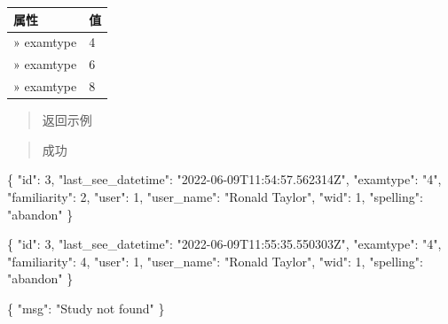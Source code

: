 \documentclass[
]{article}
\newenvironment{Shaded}{}{}
\newcommand{\DataTypeTok}[1]{\textcolor[rgb]{0.56,0.13,0.00}{#1}}
\newcommand{\DecValTok}[1]{\textcolor[rgb]{0.25,0.63,0.44}{#1}}
\newcommand{\FunctionTok}[1]{\textcolor[rgb]{0.02,0.16,0.49}{#1}}
\newcommand{\StringTok}[1]{\textcolor[rgb]{0.25,0.44,0.63}{#1}}
\begin{document}
\begin{longtable}[]{@{}ll@{}}
\toprule
属性 & 值 \\
\midrule
\endhead
» examtype & 4 \\
» examtype & 6 \\
» examtype & 8 \\
\bottomrule
\end{longtable}

\begin{quote}
返回示例
\end{quote}

\begin{quote}
成功
\end{quote}

\begin{Shaded}
\begin{Highlighting}[]
\FunctionTok{\{}
  \DataTypeTok{"id"}\FunctionTok{:} \DecValTok{3}\FunctionTok{,}
  \DataTypeTok{"last\_see\_datetime"}\FunctionTok{:} \StringTok{"2022{-}06{-}09T11:54:57.562314Z"}\FunctionTok{,}
  \DataTypeTok{"examtype"}\FunctionTok{:} \StringTok{"4"}\FunctionTok{,}
  \DataTypeTok{"familiarity"}\FunctionTok{:} \DecValTok{2}\FunctionTok{,}
  \DataTypeTok{"user"}\FunctionTok{:} \DecValTok{1}\FunctionTok{,}
  \DataTypeTok{"user\_name"}\FunctionTok{:} \StringTok{"Ronald Taylor"}\FunctionTok{,}
  \DataTypeTok{"wid"}\FunctionTok{:} \DecValTok{1}\FunctionTok{,}
  \DataTypeTok{"spelling"}\FunctionTok{:} \StringTok{"abandon"}
\FunctionTok{\}}
\end{Highlighting}
\end{Shaded}

\begin{Shaded}
\begin{Highlighting}[]
\FunctionTok{\{}
  \DataTypeTok{"id"}\FunctionTok{:} \DecValTok{3}\FunctionTok{,}
  \DataTypeTok{"last\_see\_datetime"}\FunctionTok{:} \StringTok{"2022{-}06{-}09T11:55:35.550303Z"}\FunctionTok{,}
  \DataTypeTok{"examtype"}\FunctionTok{:} \StringTok{"4"}\FunctionTok{,}
  \DataTypeTok{"familiarity"}\FunctionTok{:} \DecValTok{4}\FunctionTok{,}
  \DataTypeTok{"user"}\FunctionTok{:} \DecValTok{1}\FunctionTok{,}
  \DataTypeTok{"user\_name"}\FunctionTok{:} \StringTok{"Ronald Taylor"}\FunctionTok{,}
  \DataTypeTok{"wid"}\FunctionTok{:} \DecValTok{1}\FunctionTok{,}
  \DataTypeTok{"spelling"}\FunctionTok{:} \StringTok{"abandon"}
\FunctionTok{\}}
\end{Highlighting}
\end{Shaded}

\begin{Shaded}
\begin{Highlighting}[]
\FunctionTok{\{}
  \DataTypeTok{"msg"}\FunctionTok{:} \StringTok{"Study not found"}
\FunctionTok{\}}
\end{Highlighting}
\end{Shaded}
\end{document}
